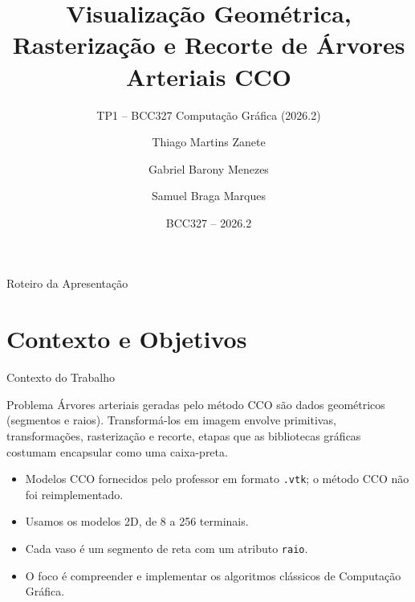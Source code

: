 \documentclass[aspectratio=169,11pt]{beamer}
\title[Visualização CCO - Computação Gráfica]{Visualização Geométrica, Rasterização e Recorte de Árvores Arteriais CCO}
\subtitle{TP1 -- BCC327 Computação Gráfica (2026.2)}
\author{Thiago Martins Zanete \and Gabriel Barony Menezes \and Samuel Braga Marques}
\institute[UFOP]{Departamento de Computação (DECOM)\\Universidade Federal de Ouro Preto (UFOP)}
\date{BCC327 -- 2026.2}
\begin{document}
\begin{frame}
  \titlepage
\end{frame}

\begin{frame}{Roteiro da Apresentação}
\tableofcontents
\end{frame}

\section{Contexto e Objetivos}

\begin{frame}{Contexto do Trabalho}
\begin{block}{Problema}
Árvores arteriais geradas pelo método CCO são dados geométricos (segmentos e raios). Transformá-los em imagem envolve primitivas, transformações, rasterização e recorte, etapas que as bibliotecas gráficas costumam encapsular como uma caixa-preta.
\end{block}

\vspace{0.25cm}

\begin{itemize}
  \item Modelos CCO fornecidos pelo professor em formato \texttt{.vtk}; o método CCO \alert{não} foi reimplementado.
  \item Usamos os modelos 2D, de 8 a 256 terminais.
  \item Cada vaso é um segmento de reta com um atributo \texttt{raio}.
  \item O foco é compreender e implementar os \alert{algoritmos clássicos} de Computação Gráfica.
\end{itemize}
\end{frame}
\end{document}
